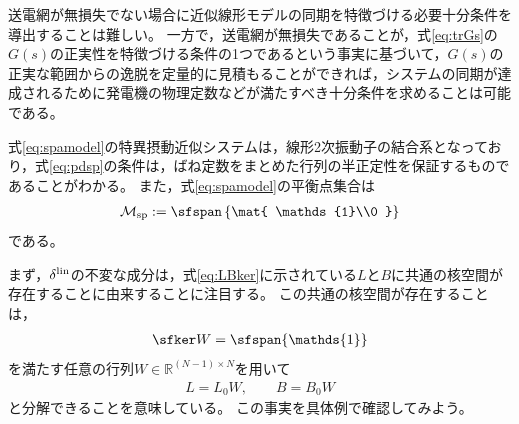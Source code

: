 \documentclass[tombow,dvipdfmx]{corona-a5}
\begin{document}
送電網が無損失でない場合に近似線形モデルの同期を特徴づける必要十分条件を導出することは難しい。
一方で，送電網が無損失であることが，式\ref{eq:trGs}の$G(s)$の正実性を特徴づける条件の1つであるという事実に基づいて，$G(s)$の正実な範囲からの逸脱を定量的に見積もることができれば，システムの同期が達成されるために発電機の物理定数などが満たすべき十分条件を求めることは可能である。









式\ref{eq:spamodel}の特異摂動近似システムは，線形2次振動子の結合系となっており，式\ref{eq:pdsp}の条件は，ばね定数をまとめた行列の半正定性を保証するものであることがわかる。
また，式\ref{eq:spamodel}の平衡点集合は
\begin{align}\label{eq:Msp}
\mathcal{M}_{\rm sp} := \sfspan 
\left\{
\mat{ \mathds{1}\\0 }
\right\}
\end{align}
である。




まず，$\delta^{\rm lin}$の不変な成分は，式\ref{eq:LBker}に示されている$L$と$B$に共通の核空間が存在することに由来することに注目する。
この共通の核空間が存在することは，
\begin{align}\label{eq:sfkerW}
\sfker W = \sfspan\{ \mathds{1}\}
\end{align}
を満たす任意の行列$W \in \mathbb{R}^{(N-1)\times N}$を用いて
\begin{align}\label{eq:decLB}
L = L_0 W 
,\qquad
B = B_0 W 
\end{align}
と分解できることを意味している。
この事実を具体例で確認してみよう。
\end{document}
